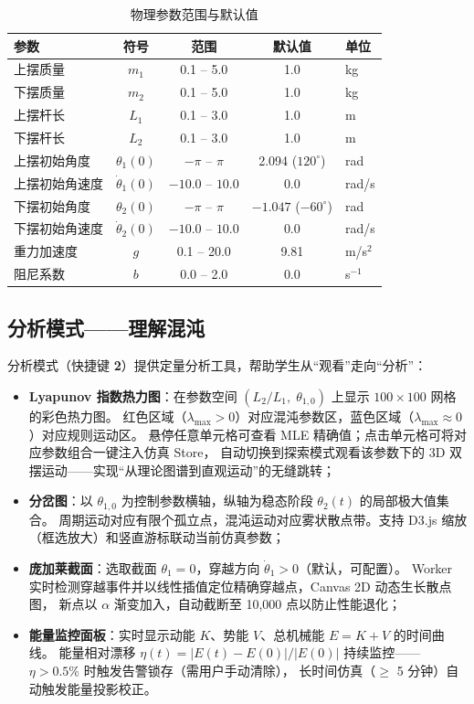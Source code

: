 \begin{table}[htbp]
  \centering
  \caption{物理参数范围与默认值}
  \label{tab:params}
  \begin{tabularx}{\textwidth}{l c c c l}
    \toprule
    \textbf{参数} & \textbf{符号} & \textbf{范围} & \textbf{默认值} & \textbf{单位} \\
    \midrule
    上摆质量 & $m_1$ & 0.1 -- 5.0 & 1.0 & kg \\
    下摆质量 & $m_2$ & 0.1 -- 5.0 & 1.0 & kg \\
    上摆杆长 & $L_1$ & 0.1 -- 3.0 & 1.0 & m \\
    下摆杆长 & $L_2$ & 0.1 -- 3.0 & 1.0 & m \\
    上摆初始角度 & $\theta_1(0)$ & $-\pi$ -- $\pi$ & 2.094 ($120^\circ$) & rad \\
    上摆初始角速度 & $\dot{\theta}_1(0)$ & $-10.0$ -- $10.0$ & 0.0 & rad/s \\
    下摆初始角度 & $\theta_2(0)$ & $-\pi$ -- $\pi$ & $-1.047$ ($-60^\circ$) & rad \\
    下摆初始角速度 & $\dot{\theta}_2(0)$ & $-10.0$ -- $10.0$ & 0.0 & rad/s \\
    重力加速度 & $g$ & 0.1 -- 20.0 & 9.81 & m/s$^2$ \\
    阻尼系数 & $b$ & 0.0 -- 2.0 & 0.0 & s$^{-1}$ \\
    \bottomrule
  \end{tabularx}
\end{table}

\subsection{分析模式——理解混沌}

分析模式（快捷键 \textbf{2}）提供定量分析工具，帮助学生从“观看”走向“分析”：

\begin{itemize}
  \item \textbf{Lyapunov 指数热力图}：在参数空间 $(L_2/L_1,\;\theta_{1,0})$ 上显示 $100 \times 100$ 网格的彩色热力图。
       红色区域（$\lambda_{\max} > 0$）对应混沌参数区，蓝色区域（$\lambda_{\max} \approx 0$）对应规则运动区。
       悬停任意单元格可查看 MLE 精确值；点击单元格可将对应参数组合一键注入仿真 Store，
       自动切换到探索模式观看该参数下的 3D 双摆运动——实现“从理论图谱到直观运动”的无缝跳转；
  \item \textbf{分岔图}：以 $\theta_{1,0}$ 为控制参数横轴，纵轴为稳态阶段 $\theta_2(t)$ 的局部极大值集合。
       周期运动对应有限个孤立点，混沌运动对应雾状散点带。支持 D3.js 缩放（框选放大）和竖直游标联动当前仿真参数；
  \item \textbf{庞加莱截面}：选取截面 $\theta_1 = 0$，穿越方向 $\dot{\theta}_1 > 0$（默认，可配置）。
       Worker 实时检测穿越事件并以线性插值定位精确穿越点，Canvas 2D 动态生长散点图，
       新点以 $\alpha$ 渐变加入，自动截断至 10,000 点以防止性能退化；
  \item \textbf{能量监控面板}：实时显示动能 $K$、势能 $V$、总机械能 $E = K + V$ 的时间曲线。
       能量相对漂移 $\eta(t) = |E(t)-E(0)|/|E(0)|$ 持续监控——$\eta > 0.5\%$ 时触发告警锁存（需用户手动清除），
       长时间仿真（$\geq$ 5 分钟）自动触发能量投影校正。
\end{itemize}

